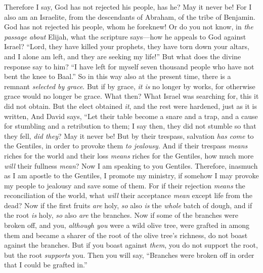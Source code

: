 \begin{biblechapter} %
 Therefore I say, God has not rejected his people, has he? May it never be! For I also am an Israelite, from the descendants of Abraham, of the tribe of Benjamin.
\verse God has not rejected his people, whom he foreknew! Or do you not know, in \textit{the passage about} Elijah, what the scripture says—how he appeals to God against Israel?
\verse “Lord, they have killed your prophets, they have torn down your altars, and I alone am left, and they are seeking my life!”
\verse But what does the divine response say to him? “I have left for myself seven thousand people who have not bent the knee to Baal.”
\verse So in this way also at the present time, there is a remnant \textit{selected by grace}.
\verse But if by grace, \textit{it is} no longer by works, for otherwise grace would no longer be grace.
\verse What then? What Israel was searching for, this it did not obtain. But the elect obtained \textit{it}, and the rest were hardened,
\verse just as it is written,
\verse And David says,
\verse “Let their table become a snare and a trap, 
and a cause for stumbling and a retribution to them;
\verse I say then, they did not stumble so that they fell, \textit{did they}? May it never be! But by their trespass, salvation \textit{has come} to the Gentiles, in order to provoke them \textit{to jealousy}.
\verse And if their trespass \textit{means} riches for the world and their loss \textit{means} riches for the Gentiles, how much more \textit{will} their fullness \textit{mean}?
 Now I am speaking to you Gentiles. Therefore, inasmuch as I am apostle to the Gentiles, I promote my ministry,
\verse if somehow I may provoke my people to jealousy and save some of them.
\verse For if their rejection \textit{means} the reconciliation of the world, what \textit{will} their acceptance \textit{mean} except life from the dead?
\verse Now if the first fruits \textit{are} holy, \textit{so} also \textit{is} the \textit{whole} batch of dough, and if the root \textit{is} holy, \textit{so} also \textit{are} the branches.
\verse Now if some of the branches were broken off, and you, \textit{although you} were a wild olive tree, were grafted in among them and became a sharer of the root of the olive tree’s richness,
\verse do not boast against the branches. But if you boast against \textit{them}, you do not support the root, but the root \textit{supports} you.
\verse Then you will say, “Branches were broken off in order that I could be grafted in.”

\end{biblechapter}
